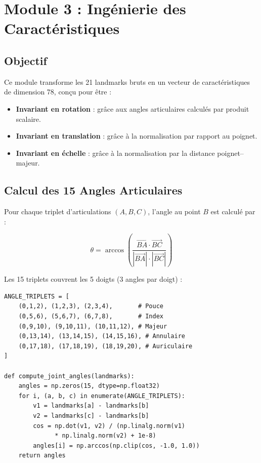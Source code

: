 \section{Module 3 : Ingénierie des Caractéristiques}

\subsection{Objectif}

Ce module transforme les 21 landmarks bruts en un vecteur de caractéristiques de dimension 78, conçu pour être :
\begin{itemize}
    \item \textbf{Invariant en rotation} : grâce aux angles articulaires calculés par produit scalaire.
    \item \textbf{Invariant en translation} : grâce à la normalisation par rapport au poignet.
    \item \textbf{Invariant en échelle} : grâce à la normalisation par la distance poignet--majeur.
\end{itemize}

\subsection{Calcul des 15 Angles Articulaires}

Pour chaque triplet d'articulations $(A, B, C)$, l'angle au point $B$ est calculé par :

\begin{equation}
    \theta = \arccos\left(\frac{\vec{BA} \cdot \vec{BC}}{|\vec{BA}| \cdot |\vec{BC}|}\right)
\end{equation}

Les 15 triplets couvrent les 5 doigts (3 angles par doigt) :

\begin{lstlisting}[style=python, caption={Calcul des angles articulaires}]
ANGLE_TRIPLETS = [
    (0,1,2), (1,2,3), (2,3,4),       # Pouce
    (0,5,6), (5,6,7), (6,7,8),       # Index
    (0,9,10), (9,10,11), (10,11,12), # Majeur
    (0,13,14), (13,14,15), (14,15,16), # Annulaire
    (0,17,18), (17,18,19), (18,19,20), # Auriculaire
]

def compute_joint_angles(landmarks):
    angles = np.zeros(15, dtype=np.float32)
    for i, (a, b, c) in enumerate(ANGLE_TRIPLETS):
        v1 = landmarks[a] - landmarks[b]
        v2 = landmarks[c] - landmarks[b]
        cos = np.dot(v1, v2) / (np.linalg.norm(v1)
              * np.linalg.norm(v2) + 1e-8)
        angles[i] = np.arccos(np.clip(cos, -1.0, 1.0))
    return angles
\end{lstlisting}

